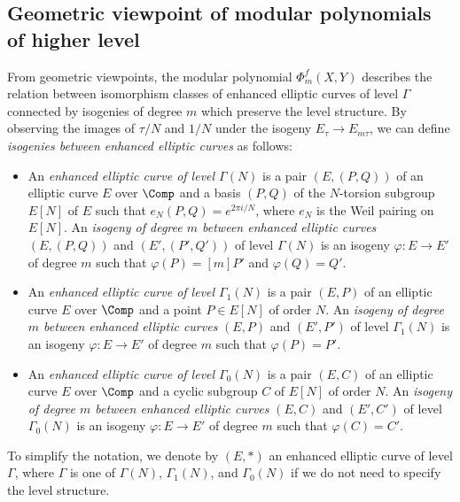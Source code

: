 \documentclass{amsart}
\theoremstyle{definition}
\theoremstyle{remark}
\numberwithin{equation}{section}
\begin{document}
\subsection{Geometric viewpoint of modular polynomials of higher level}
From geometric viewpoints,
the modular polynomial $\Phi_m^f(X, Y)$
describes the relation between isomorphism classes of enhanced elliptic curves
of level $\Gamma$ connected by isogenies of degree $m$
which preserve the level structure.
By observing the images of $\tau/N$ and $1/N$
under the isogeny $E_\tau \to E_{m\tau}$,
we can define \emph{isogenies between enhanced elliptic curves} as follows:
\begin{itemize}
    \item An \emph{enhanced elliptic curve of level $\Gamma(N)$}
        is a pair $(E, (P, Q))$ of an elliptic curve $E$ over $\Comp$
        and a basis $(P, Q)$ of the $N$-torsion subgroup $E[N]$ of $E$
        such that $e_N(P, Q) = e^{2\pi i / N}$,
        where $e_N$ is the Weil pairing on $E[N]$.
        An \emph{isogeny of degree $m$ between enhanced elliptic curves}
        $(E, (P, Q))$ and $(E', (P', Q'))$ of level $\Gamma(N)$
        is an isogeny $\varphi: E \to E'$ of degree $m$
        such that $\varphi(P) = [m]P'$ and $\varphi(Q) = Q'$.
    \item An \emph{enhanced elliptic curve of level $\Gamma_1(N)$}
        is a pair $(E, P)$ of an elliptic curve $E$ over $\Comp$
        and a point $P \in E[N]$ of order $N$.
        An \emph{isogeny of degree $m$ between enhanced elliptic curves}
        $(E, P)$ and $(E', P')$ of level $\Gamma_1(N)$
        is an isogeny $\varphi: E \to E'$ of degree $m$
        such that $\varphi(P) = P'$.
    \item An \emph{enhanced elliptic curve of level $\Gamma_0(N)$}
        is a pair $(E, C)$ of an elliptic curve $E$ over $\Comp$
        and a cyclic subgroup $C$ of $E[N]$ of order $N$.
        An \emph{isogeny of degree $m$ between enhanced elliptic curves}
        $(E, C)$ and $(E', C')$ of level $\Gamma_0(N)$
        is an isogeny $\varphi: E \to E'$ of degree $m$
        such that $\varphi(C) = C'$.
\end{itemize}
To simplify the notation,
we denote by $(E, \ast)$ an enhanced elliptic curve of level $\Gamma$,
where $\Gamma$ is one of $\Gamma(N)$, $\Gamma_1(N)$, and $\Gamma_0(N)$
if we do not need to specify the level structure.
\end{document}

